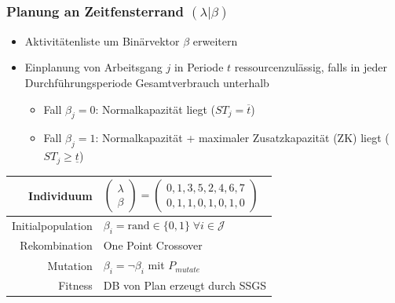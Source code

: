 \begin{frame}
\frametitle{Planung an Zeitfensterrand $(\lambda|\beta)$}
\begin{itemize}
\item Aktivitätenliste um Binärvektor $\beta$ erweitern
\item Einplanung von Arbeitsgang $j$ in Periode $t$ ressourcenzulässig, falls in jeder Durchführungsperiode Gesamtverbrauch unterhalb
	\begin{itemize}
	\item Fall $\beta_j=0$: Normalkapazität liegt ($ST_j=\overline{t}$)
	\item Fall $\beta_j=1$: Normalkapazität + maximaler Zusatzkapazität (ZK) liegt ($ST_j \geq \underline{t}$)
	\end{itemize}
\end{itemize}
\begin{small}
\begin{center}
\begin{tabular}{rl}
\hline 
Individuum & $\begin{pmatrix}\lambda\\\beta\end{pmatrix}=\begin{pmatrix}0,1,3,5,2,4,6,7\\0,1,1,0,1,0,1,0\end{pmatrix}$\parbox[c][40pt][c]{0pt}{}\tabularnewline
\hline 
Initialpopulation & $\beta_i=\mbox{rand} \in \{0,1\} \; \forall i \in \mathcal{J}$\tabularnewline
\hline 
Rekombination & One Point Crossover\tabularnewline
\hline 
Mutation & $\beta_i=\neg \beta_i$ mit $P_{mutate}$\tabularnewline
\hline 
Fitness & DB von Plan erzeugt durch SSGS\tabularnewline
\hline 
\end{tabular}
\end{center}
\end{small}
\end{frame}

